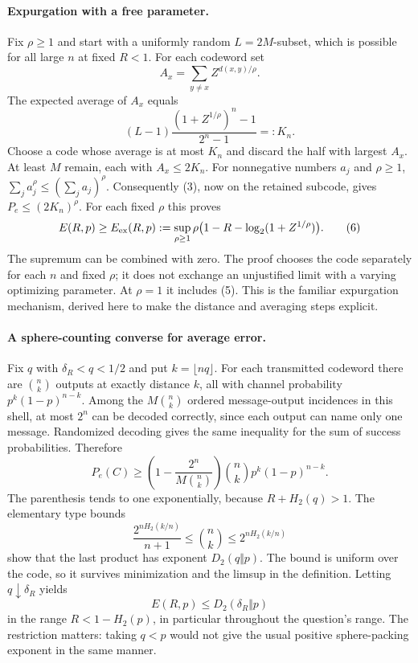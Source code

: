 \documentclass[11pt]{article}
\begin{document}
\paragraph{Expurgation with a free parameter.}
Fix $\rho\ge1$ and start with a uniformly random $L=2M$-subset,
which is possible for all large $n$ at fixed $R<1$.
For each codeword set
\[
              A_x=\sum_{y\ne x} Z^{d(x,y)/\rho}.
\]
The expected average of $A_x$ equals
\[
 (L-1)\frac{(1+Z^{1/\rho})^n-1}{2^n-1}=:K_n.
\]
Choose a code whose average is at most $K_n$ and discard the half
with largest $A_x$. At least $M$ remain, each with $A_x\le2K_n$.
For nonnegative numbers $a_j$ and $\rho\ge1$,
$\sum_j a_j^\rho\le(\sum_j a_j)^\rho$.
Consequently (3), now on the retained subcode, gives
$P_e\le(2K_n)^\rho$. For each fixed $\rho$ this proves
\[
 E(R,p)\ge E_{\rm ex}(R,p):=
 \sup_{\rho\ge1}\rho\bigl(1-R-\log_2(1+Z^{1/\rho})\bigr). \tag{6}
\]
The supremum can be combined with zero. The proof chooses the code
separately for each $n$ and fixed $\rho$; it does not exchange an
unjustified limit with a varying optimizing parameter.
At $\rho=1$ it includes (5). This is the familiar expurgation
mechanism, derived here to make the distance and averaging steps explicit.

\paragraph{A sphere-counting converse for average error.}
Fix $q$ with $\delta_R<q<1/2$ and put $k=\lfloor nq\rfloor$.
For each transmitted codeword there are $\binom nk$ outputs at exactly
distance $k$, all with channel probability $p^k(1-p)^{n-k}$.
Among the $M\binom nk$ ordered message-output incidences in this shell,
at most $2^n$ can be decoded correctly, since each output can name only
one message. Randomized decoding gives the same inequality for the
sum of success probabilities. Therefore
\[
 P_e(C)\ge
 \left(1-\frac{2^n}{M\binom nk}\right)
             \binom nk p^k(1-p)^{n-k}.                  \tag{7}
\]
The parenthesis tends to one exponentially, because
$R+H_2(q)>1$. The elementary type bounds
\[
 \frac{2^{nH_2(k/n)}}{n+1}\le\binom nk\le2^{nH_2(k/n)}
\]
show that the last product has exponent $D_2(q\Vert p)$.
The bound is uniform over the code, so it survives minimization and
the limsup in the definition. Letting $q\downarrow\delta_R$ yields
\[
                     E(R,p)\le D_2(\delta_R\Vert p)       \tag{8}
\]
in the range $R<1-H_2(p)$, in particular throughout the question's
range. The restriction matters: taking $q<p$ would not give the usual
positive sphere-packing exponent in the same manner.
\end{document}
